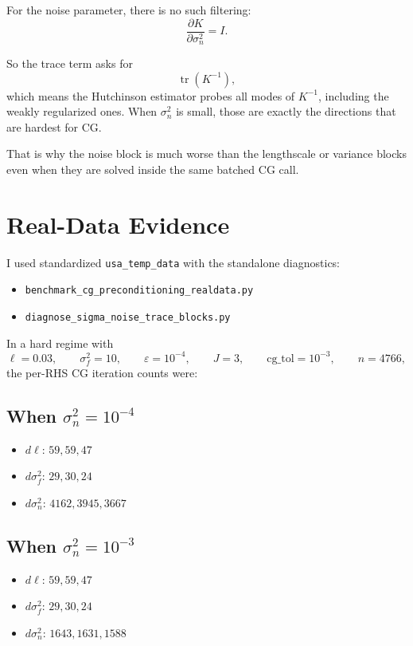 \documentclass[11pt]{article}
\begin{document}
For the noise parameter, there is no such filtering:
\begin{equation}
\frac{\partial K}{\partial \sigma_n^2} = I.
\end{equation}

So the trace term asks for
\begin{equation}
\operatorname{tr}(K^{-1}),
\end{equation}
which means the Hutchinson estimator probes all modes of $K^{-1}$, including
the weakly regularized ones. When $\sigma_n^2$ is small, those are exactly the
directions that are hardest for CG.

That is why the noise block is much worse than the lengthscale or variance
blocks even when they are solved inside the same batched CG call.

\section*{Real-Data Evidence}

I used standardized \texttt{usa\_temp\_data} with the standalone diagnostics:
\begin{itemize}
  \item \texttt{benchmark\_cg\_preconditioning\_realdata.py}
  \item \texttt{diagnose\_sigma\_noise\_trace\_blocks.py}
\end{itemize}

In a hard regime with
\begin{equation}
\ell = 0.03,
\qquad
\sigma_f^2 = 10,
\qquad
\varepsilon = 10^{-4},
\qquad
J = 3,
\qquad
\text{cg\_tol} = 10^{-3},
\qquad
n = 4766,
\end{equation}
the per-RHS CG iteration counts were:

\subsection*{When $\sigma_n^2 = 10^{-4}$}
\begin{itemize}
  \item $d\ell$: $59, 59, 47$
  \item $d\sigma_f^2$: $29, 30, 24$
  \item $d\sigma_n^2$: $4162, 3945, 3667$
\end{itemize}

\subsection*{When $\sigma_n^2 = 10^{-3}$}
\begin{itemize}
  \item $d\ell$: $59, 59, 47$
  \item $d\sigma_f^2$: $29, 30, 24$
  \item $d\sigma_n^2$: $1643, 1631, 1588$
\end{itemize}
\end{document}
